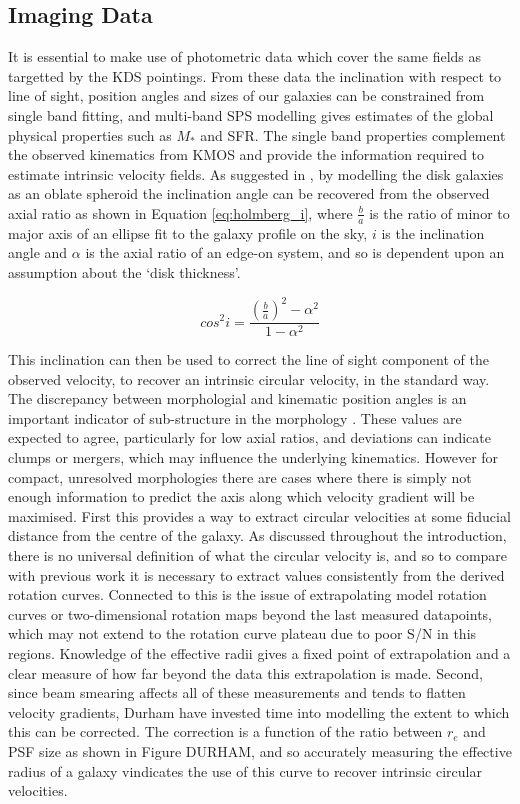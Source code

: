 \documentclass[a4paper,fleqn,usenatbib]{mn2e}
\begin{document}
\subsection{Imaging Data}
It is essential to make use of photometric data which cover the same fields as targetted by the KDS pointings.
From these data the inclination with respect to line of sight, position angles and sizes of our galaxies can be constrained from single band fitting, and multi-band SPS modelling gives estimates of the global physical properties such as $M_{*}$ and SFR. 
The single band properties complement the observed kinematics from KMOS and provide the information required to estimate intrinsic velocity fields.
As suggested in \cite{Holmberg1958}, by modelling the disk galaxies as an oblate spheroid the inclination angle can be recovered from the observed axial ratio as shown in Equation \ref{eq:holmberg_i}, where $\frac{b}{a}$ is the ratio of minor to major axis of an ellipse fit to the galaxy profile on the sky, $i$ is the inclination angle and $\alpha$ is the axial ratio of an edge-on system, and so is dependent upon an assumption about the `disk thickness'.

\begin{equation}\label{eq:holmberg_i}
   cos^{2}i = \frac{\left(\frac{b}{a}\right)^{2} - \alpha^{2}}{1 - \alpha^{2}}
\end{equation}

This inclination can then be used to correct the line of sight component of the observed velocity, to recover an intrinsic circular velocity, in the standard way.
The discrepancy between morphologial and kinematic position angles is an important indicator of sub-structure in the morphology \citep{Queyrel2012,Wisnioski2015}.
These values are expected to agree, particularly for low axial ratios, and deviations can indicate clumps or mergers, which may influence the underlying kinematics. 
However for compact, unresolved morphologies there are cases where there is simply not enough information to predict the axis along which velocity gradient will be maximised. 
First this provides a way to extract circular velocities at some fiducial distance from the centre of the galaxy.
As discussed throughout the introduction, there is no universal definition of what the circular velocity is, and so to compare with previous work it is necessary to extract values consistently from the derived rotation curves.
Connected to this is the issue of extrapolating model rotation curves or two-dimensional rotation maps beyond the last measured datapoints, which may not extend to the rotation curve plateau due to poor S/N in this regions.
Knowledge of the effective radii gives a fixed point of extrapolation and a clear measure of how far beyond the data this extrapolation is made.
Second, since beam smearing affects all of these measurements and tends to flatten velocity gradients, Durham have invested time into modelling the extent to which this can be corrected.
The correction is a function of the ratio between $r_{e}$ and PSF size as shown in Figure DURHAM, and so accurately measuring the effective radius of a galaxy vindicates the use of this curve to recover intrinsic circular velocities. \\
\end{document}
